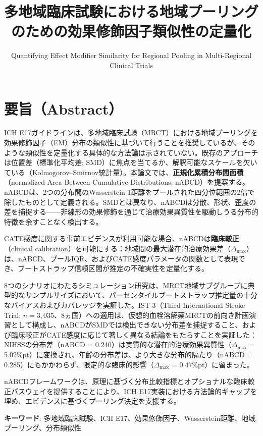 \documentclass[
  a4paper,
  11pt]{ltjsarticle}
\title{多地域臨床試験における地域プーリングのための効果修飾因子類似性の定量化}
\subtitle{Quantifying Effect Modifier Similarity for Regional Pooling in
Multi-Regional Clinical Trials}
\author{}
\date{}
\begin{document}
\maketitle

\section*{要旨（Abstract）}\label{ux8981ux65e8abstract}

ICH
E17ガイドラインは、多地域臨床試験（MRCT）における地域プーリングを効果修飾因子（EM）分布の類似性に基づいて行うことを推奨しているが、そのような類似性を定量化する具体的な方法論は示されていない。既存のアプローチは位置差（標準化平均差;
SMD）に焦点を当てるか、解釈可能なスケールを欠いている（Kolmogorov--Smirnov統計量）。本論文では、\textbf{正規化累積分布間面積}（normalized
Area Between Cumulative Distributions;
nABCD）を提案する。nABCDは、2つの分布間のWasserstein-1距離をプールされた四分位範囲の2倍で除したものとして定義される。SMDとは異なり、nABCDは分散、形状、歪度の差を捕捉する------非線形の効果修飾を通じて治療効果異質性を駆動しうる分布的特徴を余すことなく検出する。

CATE感度に関する事前エビデンスが利用可能な場合、nABCDは\textbf{臨床較正}（clinical
calibration）を可能にする：地域間の最大潜在的治療効果差（\(\Delta_{\max}\)）は、nABCD、プールIQR、およびCATE感度パラメータの関数として表現でき、ブートストラップ信頼区間が推定の不確実性を定量化する。

8つのシナリオにわたるシミュレーション研究は、MRCT地域サブグループに典型的なサンプルサイズにおいて、パーセンタイルブートストラップ推定量の十分なバイアスおよびカバレッジを実証した。IST-3（Third
International Stroke Trial;
\(n=3{,}035\)、8ヵ国）への適用は、仮想的血栓溶解薬MRCTの前向き計画演習として構成し、nABCDがSMDでは検出できない分布差を捕捉すること、および臨床較正がCATE感度に応じて著しく異なる結論をもたらすことを実証した：NIHSSの分布差（nABCD
= 0.240）は実質的な潜在的治療効果異質性（\(\Delta_{\max}\) =
5.02\%pt）に変換され、年齢の分布差は、より大きな分布的隔たり（nABCD =
0.285）にもかかわらず、限定的な臨床的影響（\(\Delta_{\max}\) =
0.47\%pt）に留まった。

nABCDフレームワークは、原理に基づく分布比較指標とオプショナルな臨床較正パスウェイを提供することにより、ICH
E17実装における方法論的ギャップを埋め、エビデンスに基づくプーリング決定を支援する。

\textbf{キーワード}: 多地域臨床試験、ICH
E17、効果修飾因子、Wasserstein距離、地域プーリング、分布類似性
\end{document}
